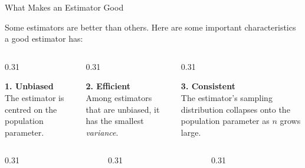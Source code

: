 \documentclass[9pt,english,aspectratio=169]{beamer}
\begin{document}
\begin{frame}[label=estimator-good]{What Makes an Estimator Good}

  \vspace{0.3em}
  Some estimators are better than others. Here are some important characteristics a good estimator has:

  \vspace{0.8em}
  \begin{columns}[T]
    \begin{column}{0.31\textwidth}
      \begin{methodbox}
        \textbf{1. Unbiased} \\[0.3em]
        {\small The estimator is centred on the population parameter.}
      \end{methodbox}
    \end{column}
    \begin{column}{0.31\textwidth}
      \begin{methodbox}
        \textbf{2. Efficient} \\[0.3em]
        {\small Among estimators that are unbiased, it has the smallest \emph{variance}.}
      \end{methodbox}
    \end{column}
    \begin{column}{0.31\textwidth}
      \begin{methodbox}
        \textbf{3. Consistent} \\[0.3em]
        {\small The estimator's sampling distribution collapses onto the population parameter as $n$ grows large.}
      \end{methodbox}
    \end{column}
  \end{columns}

  \vspace{0.8em}
  \begin{columns}
    \begin{column}{0.31\textwidth}
      \centering\hyperlink{unbiasedness}{}
    \end{column}
    \begin{column}{0.31\textwidth}
      \centering\hyperlink{efficiency}{}
    \end{column}
    \begin{column}{0.31\textwidth}
      \centering\hyperlink{consistency}{}
    \end{column}
  \end{columns}


\end{frame}
\end{document}
